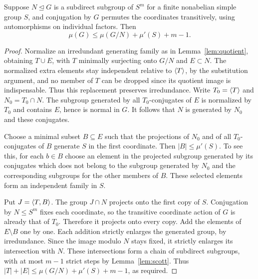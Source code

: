 \begin{lemma}\label{lem:simplekernel}
Suppose $N\unlhd G$ is a subdirect subgroup of $S^m$ for a finite
nonabelian simple group $S$, and conjugation by $G$ permutes the
coordinates transitively, using automorphisms on individual factors.
Then
\begin{equation}\label{eq:simplekernel}
 \mu(G)\leq\mu(G/N)+\mu'(S)+m-1.                    \end{equation}
\end{lemma}
\begin{proof}
Normalize an irredundant generating family as in
Lemma~\ref{lem:quotient}, obtaining $T\cup E$, with $T$ minimally
surjecting onto $G/N$ and $E\subset N$. The normalized extra elements stay independent relative to $\langle T\rangle$,
by the substitution argument, and no member of $T$ can be dropped since
its quotient image is indispensable. Thus this replacement preserves
irredundance. Write $T_0=\langle T\rangle$ and $N_0=T_0\cap N$.
The subgroup generated by all $T_0$-conjugates of $E$ is normalized by
$T_0$ and contains $E$, hence is normal in $G$. It follows that
$N$ is generated by $N_0$ and these conjugates.

Choose a minimal subset $B\subseteq E$ such that the projections of
$N_0$ and of all $T_0$-conjugates of $B$ generate $S$ in the first
coordinate. Then $|B|\leq\mu'(S)$. To see this, for each $b\in B$
choose an element in the projected subgroup generated by its conjugates
which does not belong to the subgroup generated by $N_0$ and the
corresponding subgroups for the other members of $B$. These selected
elements form an independent family in $S$.

Put $J=\langle T,B\rangle$. The group $J\cap N$ projects onto the first copy
of $S$. Conjugation by $N\leq S^m$ fixes each coordinate, so the transitive
coordinate action of $G$ is already that of $T_0$. Therefore
it projects onto every copy. Add the elements of $E\setminus B$
one by one. Each addition strictly enlarges the generated group, by
irredundance. Since the image modulo $N$ stays fixed, it strictly
enlarges its intersection with $N$. These intersections form a chain
of subdirect subgroups, with at most $m-1$ strict steps by
Lemma~\ref{lem:scott}. Thus
$|T|+|E|\leq\mu(G/N)+\mu'(S)+m-1$, as required.
\end{proof}

